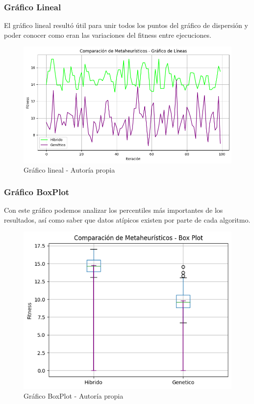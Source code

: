 \documentclass{article}
\begin{document}
\subsubsection{Gráfico Lineal}

El gráfico lineal resultó útil para unir todos los puntos del gráfico de dispersión y poder conocer como eran las variaciones del fitness entre ejecuciones.

\begin{figure}[H]
    \centering
    \includegraphics[width=1\linewidth]{imagenes/grafico_lineal.png}
    \caption{Gráfico lineal - Autoría propia}
    \label{fig:enter-label}
\end{figure}

\subsubsection{Gráfico BoxPlot}

Con este gráfico podemos analizar los percentiles más importantes de los resultados, así como saber que datos atípicos existen por parte de cada algoritmo.

\begin{figure}[H]
    \centering
    \includegraphics[width=0.75\linewidth]{imagenes/grafico_boxplot.png}
    \caption{Gráfico BoxPlot - Autoría propia}
    \label{fig:enter-label}
\end{figure}
\end{document}
